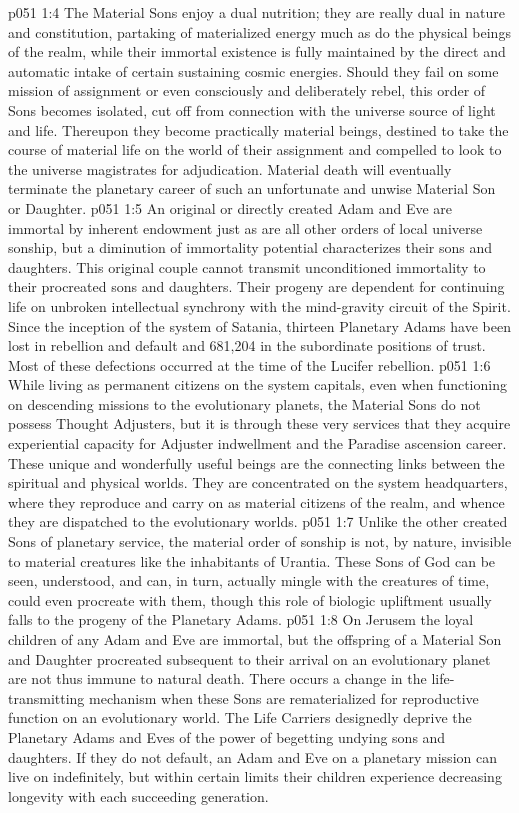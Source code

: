 \vs p051 1:4 The Material Sons enjoy a dual nutrition; they are really dual in nature and constitution, partaking of materialized energy much as do the physical beings of the realm, while their immortal existence is fully maintained by the direct and automatic intake of certain sustaining cosmic energies. Should they fail on some mission of assignment or even consciously and deliberately rebel, this order of Sons becomes isolated, cut off from connection with the universe source of light and life. Thereupon they become practically material beings, destined to take the course of material life on the world of their assignment and compelled to look to the universe magistrates for adjudication. Material death will eventually terminate the planetary career of such an unfortunate and unwise Material Son or Daughter.
\vs p051 1:5 An original or directly created Adam and Eve are immortal by inherent endowment just as are all other orders of local universe sonship, but a diminution of immortality potential characterizes their sons and daughters. This original couple cannot transmit unconditioned immortality to their procreated sons and daughters. Their progeny are dependent for continuing life on unbroken intellectual synchrony with the mind\hyp{}gravity circuit of the Spirit. Since the inception of the system of Satania, thirteen Planetary Adams have been lost in rebellion and default and 681,204 in the subordinate positions of trust. Most of these defections occurred at the time of the Lucifer rebellion.
\pc \vs p051 1:6 While living as permanent citizens on the system capitals, even when functioning on descending missions to the evolutionary planets, the Material Sons do not possess Thought Adjusters, but it is through these very services that they acquire experiential capacity for Adjuster indwellment and the Paradise ascension career. These unique and wonderfully useful beings are the connecting links between the spiritual and physical worlds. They are concentrated on the system headquarters, where they reproduce and carry on as material citizens of the realm, and whence they are dispatched to the evolutionary worlds.
\vs p051 1:7 Unlike the other created Sons of planetary service, the material order of sonship is not, by nature, invisible to material creatures like the inhabitants of Urantia. These Sons of God can be seen, understood, and can, in turn, actually mingle with the creatures of time, could even procreate with them, though this role of biologic upliftment usually falls to the progeny of the Planetary Adams.
\pc \vs p051 1:8 On Jerusem the loyal children of any Adam and Eve are immortal, but the offspring of a Material Son and Daughter procreated subsequent to their arrival on an evolutionary planet are not thus immune to natural death. There occurs a change in the life\hyp{}transmitting mechanism when these Sons are rematerialized for reproductive function on an evolutionary world. The Life Carriers designedly deprive the Planetary Adams and Eves of the power of begetting undying sons and daughters. If they do not default, an Adam and Eve on a planetary mission can live on indefinitely, but within certain limits their children experience decreasing longevity with each succeeding generation.
